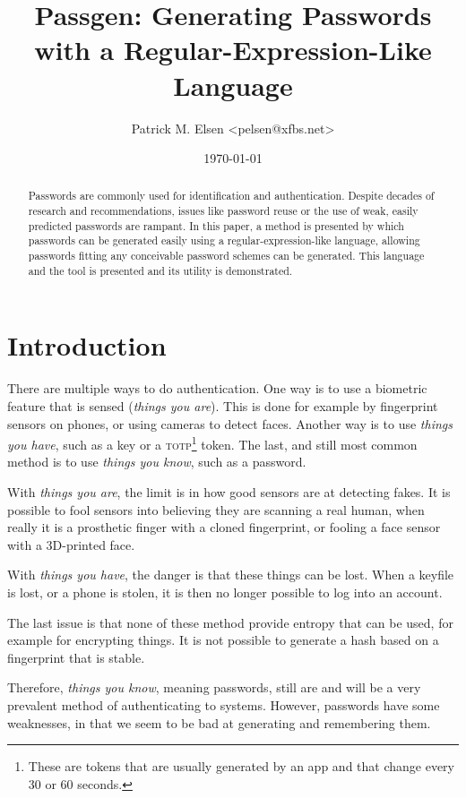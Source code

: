 \documentclass[a4paper,twocolumn]{article}
\title{Passgen: Generating Passwords with a Regular-Expression-Like Language}
\author{Patrick M. Elsen <pelsen@xfbs.net>}
\date{\today}
\begin{document}
\maketitle
\begin{abstract}
	Passwords are commonly used for identification and authentication. Despite decades of research and recommendations, issues like password reuse or the use of weak, easily predicted passwords are rampant. In this paper, a method is presented by which passwords can be generated easily using a regular-expression-like language, allowing passwords fitting any conceivable password schemes can be generated. This language and the tool is presented and its utility is demonstrated. 
\end{abstract}


\section{Introduction}





There are multiple ways to do authentication. One way is to use a biometric feature that is sensed (\emph{things you are}). This is done for example by fingerprint sensors on phones, or using cameras to detect faces. Another way is to use \emph{things you have}, such as a key or a \textsc{totp}\footnote{These are tokens that are usually generated by an app and that change every 30 or 60 seconds.} token. The last, and still most common method is to use \emph{things you know}, such as a password.

With \emph{things you are}, the limit is in how good sensors are at detecting fakes. It is possible to fool sensors into believing they are scanning a real human, when really it is a prosthetic finger with a cloned fingerprint, or fooling a face sensor with a 3D-printed face.

With \emph{things you have}, the danger is that these things can be lost. When a keyfile is lost, or a phone is stolen, it is then no longer possible to log into an account.

The last issue is that none of these method provide entropy that can be used, for example for encrypting things. It is not possible to generate a hash based on a fingerprint that is stable. 

Therefore, \emph{things you know}, meaning passwords, still are and will be a very prevalent method of authenticating to systems. However, passwords have some weaknesses, in that we seem to be bad at generating and remembering them.
\end{document}

